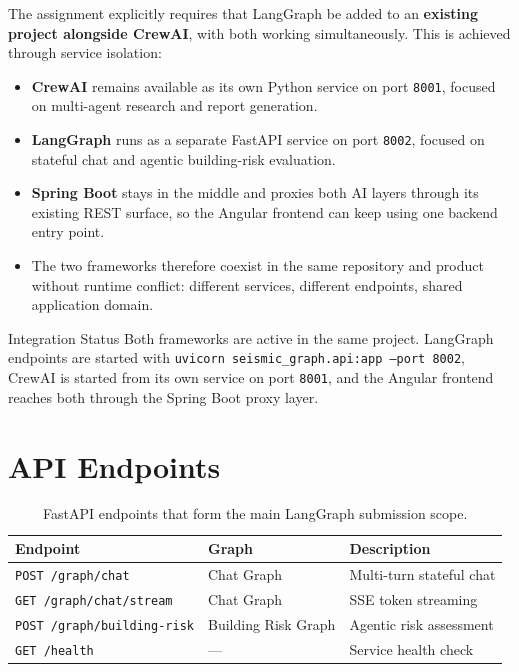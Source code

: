 \documentclass[11pt,a4paper]{article}
\begin{document}
The assignment explicitly requires that LangGraph be added to an \textbf{existing project alongside CrewAI}, with both working simultaneously. This is achieved through service isolation:

\begin{itemize}[leftmargin=1.5em]
    \item \textbf{CrewAI} remains available as its own Python service on port \texttt{8001}, focused on multi-agent research and report generation.
    \item \textbf{LangGraph} runs as a separate FastAPI service on port \texttt{8002}, focused on stateful chat and agentic building-risk evaluation.
    \item \textbf{Spring Boot} stays in the middle and proxies both AI layers through its existing REST surface, so the Angular frontend can keep using one backend entry point.
    \item The two frameworks therefore coexist in the same repository and product without runtime conflict: different services, different endpoints, shared application domain.
\end{itemize}

\begin{successbox}{Integration Status}
Both frameworks are active in the same project. LangGraph endpoints are started with \texttt{uvicorn seismic\_graph.api:app --port 8002}, CrewAI is started from its own service on port \texttt{8001}, and the Angular frontend reaches both through the Spring Boot proxy layer.
\end{successbox}

\section{API Endpoints}

\begin{table}[H]
\centering
\begin{tabular}{@{}lll@{}}
\toprule
\textbf{Endpoint} & \textbf{Graph} & \textbf{Description} \\
\midrule
\texttt{POST /graph/chat}           & Chat Graph          & Multi-turn stateful chat \\
\texttt{GET  /graph/chat/stream}    & Chat Graph          & SSE token streaming \\
\texttt{POST /graph/building-risk}  & Building Risk Graph & Agentic risk assessment \\
\texttt{GET  /health}               & ---                 & Service health check \\
\bottomrule
\end{tabular}
\caption{FastAPI endpoints that form the main LangGraph submission scope.}
\end{table}
\end{document}
